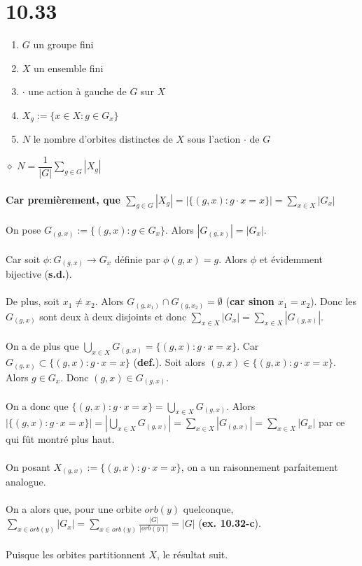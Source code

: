\documentclass[a4paper,10pt]{article}
\begin{document}
\section*{10.33}
\begin{enumerate}
 \item $G$ un groupe fini
 \item $X$ un ensemble fini
 \item $\cdot$ une action à gauche de $G$ sur $X$
 \item $X_g := \{x \in X : g \in G_x \}$
 \item $N$ le nombre d'orbites distinctes de $X$ sous l'action $\cdot$ de $G$
\end{enumerate}
$\diamond$ \textbf{$N=\dfrac{1}{|G|}\sum_{g\in G}|X_g|$}
\\
\\
\textbf{Car premièrement, que $\sum_{g\in G} |X_g| = |\{(g,x) : g\cdot x = x\}| = \sum_{x\in X }|G_x|$}
\\
\\
On pose $G_{(g,x)} := \{(g,x) : g \in G_x\}$. Alors $|G_{(g,x)}| = |G_x|$. 
\\
\\
Car soit $\phi : G_{(g,x)} \rightarrow G_x$ définie par $\phi(g,x) = g$. Alors $\phi$ et évidemment bijective (\textbf{s.d.}). 
\\
\\
De plus, soit $x_1 \not = x_2$. Alors $G_{(g,x_1)} \cap G_{(g,x_2)} = \emptyset$ (\textbf{car sinon $x_1 = x_2$}).
Donc les $G_{(g,x)}$ sont deux à deux disjoints et donc $\sum_{x \in X} |G_x| = \sum_{x\in X} |G_{(g,x)}|$. 
\\
\\
On a de plus que $\bigcup_{x \in X} G_{(g,x)} = \{(g,x) : g\cdot x = x\}$. Car $G_{(g,x)} \subset \{(g,x) : g \cdot x = x\}$ (\textbf{def.}).
Soit alors $(g,x) \in \{(g,x) : g\cdot x = x\}$. Alors $g \in G_x$. Donc $(g,x) \in G_{(g,x)}$. 
\\
\\
On a donc que $\{(g,x) : g\cdot x = x\} = \bigcup_{x \in X} G_{(g,x)}$. Alors $|\{(g,x):g \cdot x = x\}| = |\bigcup_{x \in X} G_{(g,x)}|
= \sum_{x \in X} |G_{(g,x)}| = \sum_{x \in X} |G_x|$ par ce qui fût montré plus haut.
\\
\\
On posant $X_{(g,x)} := \{(g,x) : g \cdot x = x\}$, on a un raisonnement parfaitement analogue. 
\\
\\
On a alors que, pour une orbite $orb(y)$ quelconque, $\sum_{x\in orb(y)}|G_x| = \sum_{x\in orb(y)}\frac{|G|}{|orb(y)|} = |G|$ (\textbf{ex. 10.32-c}).
\\
\\
Puisque les orbites partitionnent $X$, le résultat suit.
\end{document}
